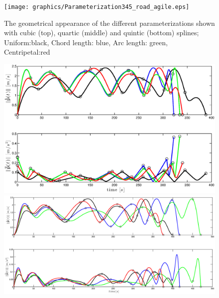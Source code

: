\begin{figure}[H]
  \begin{minipage}[t]{0.9\textwidth}
    \texttt{[image: graphics/Parameterization345\_road\_agile.eps]}
  \end{minipage}
  \caption{The geometrical appearance of the different parameterizations shown with cubic (top), quartic (middle) and quintic (bottom) splines; Uniform:black, Chord length: blue, Arc length: green, Centripetal:red}
  \label{fig:parameterization_cqq}
\end{figure}

\begin{figure}[H]
  \begin{minipage}[t]{0.9\textwidth}
    \includegraphics[width = \textwidth]{graphics/Parameterization3_road_vel_acc.eps}
  \end{minipage}
  \vfill
    \begin{minipage}[t]{0.9\textwidth}
    \includegraphics[width = \textwidth]{graphics/Parameterization4_road_vel_acc.eps}
  \end{minipage}
  \vfill
    \begin{minipage}[t]{0.9\textwidth}

\end{minipage}
\end{figure}
